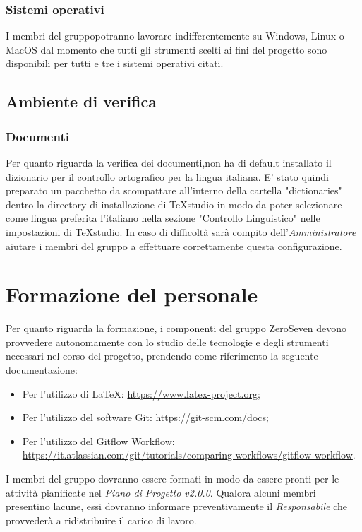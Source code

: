 \subsubsection{Sistemi operativi}
I membri del gruppopotranno lavorare indifferentemente su Windows, Linux o MacOS dal momento che tutti gli strumenti scelti ai fini del progetto sono disponibili per tutti e tre i sistemi operativi citati. 
\subsection{Ambiente di verifica}
\subsubsection{Documenti}
Per quanto riguarda la verifica dei documenti,non ha di default installato il dizionario per il controllo ortografico per la lingua italiana. E' stato quindi preparato un pacchetto da scompattare all'interno della cartella "dictionaries" dentro la directory di installazione di TeXstudio in modo da poter selezionare come lingua preferita l'italiano nella sezione "Controllo Linguistico" nelle impostazioni di TeXstudio.  In caso di difficoltà sarà compito dell'\textit{Amministratore} aiutare i membri del gruppo a effettuare correttamente questa configurazione.
\section{Formazione del personale}
Per quanto riguarda la formazione, i componenti del gruppo ZeroSeven devono provvedere autonomamente con lo studio delle tecnologie e degli strumenti necessari nel corso del progetto, prendendo come riferimento la seguente documentazione:
\begin{itemize}
	\item Per l'utilizzo di \LaTeX: \url{https://www.latex-project.org};
	\item Per l'utilizzo del software Git: \url{https://git-scm.com/docs};
	\item Per l'utilizzo del Gitflow Workflow: \url{https://it.atlassian.com/git/tutorials/comparing-workflows/gitflow-workflow}.
\end{itemize}
I membri del gruppo dovranno essere formati in modo da essere pronti per le attività pianificate nel \textit{Piano di Progetto v2.0.0}. Qualora alcuni membri presentino lacune, essi dovranno informare preventivamente il \textit{Responsabile} che provvederà a ridistribuire il carico di lavoro. 